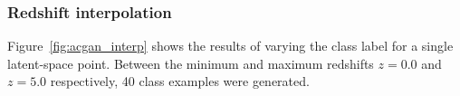 \documentclass[twocolumn]{article}
\numberwithin{equation}{section}
\begin{document}





\subsubsection{Redshift interpolation}

Figure~\ref{fig:acgan_interp} shows the results of varying the class label for a single latent-space point. Between the 
minimum and maximum redshifts $z=0.0$ and $z=5.0$ respectively, 40 class examples were generated.
\end{document}
